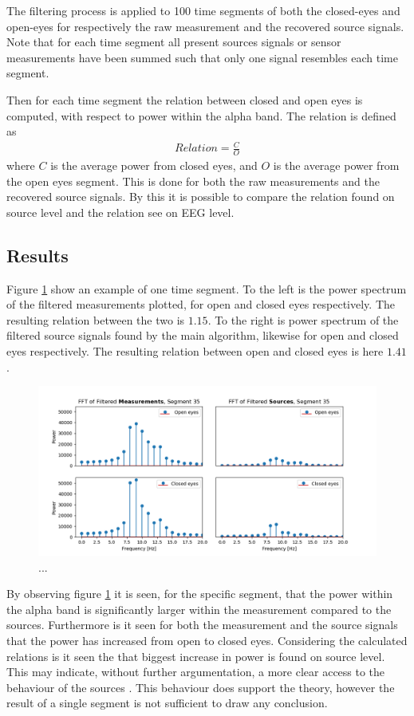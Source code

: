 The filtering process is applied to 100 time segments of both the closed-eyes and open-eyes for respectively the raw measurement and the recovered source signals. 
Note that for each time segment all present sources signals or sensor measurements have been summed such that only one signal resembles each time segment.

Then for each time segment the relation between closed and open eyes is computed, with respect to power within the alpha band. The relation is defined as 
\begin{align*}
Relation = \frac{C}{O} 
\end{align*}
where $C$ is the average power from closed eyes, and $O$ is the average power from the open eyes segment. 
This is done for both the raw measurements and the recovered source signals. By this it is possible to compare the relation found on source level and the relation see on EEG level.  

\subsection{Results}
Figure \ref{fig:dft_2} show an example of one time segment. To the left is the power spectrum of the filtered measurements plotted, for open and closed eyes respectively. The resulting relation between the two is $1.15$. To the right is power spectrum of the filtered source signals found by the main algorithm, likewise for open and closed eyes respectively. The resulting relation between open and closed eyes is here $1.41$.  
\begin{figure}[H]
\centering
\includegraphics[scale=0.5]{figures/ch_7/FFT_plot.png}
\caption{...}
\label{fig:dft_2}
\end{figure}
\noindent
By observing figure \ref{fig:dft_2} it is seen, for the specific segment, that the power within the alpha band is significantly larger within the measurement compared to the sources. Furthermore is it seen for both the measurement and the source signals that the power has increased from open to closed eyes. Considering the calculated relations is it seen the that biggest increase in power is found on source level. This may indicate, without further argumentation, a more clear access to the behaviour of the sources . 
This behaviour does support the theory, however the result of a single segment is not sufficient to draw any conclusion.          

